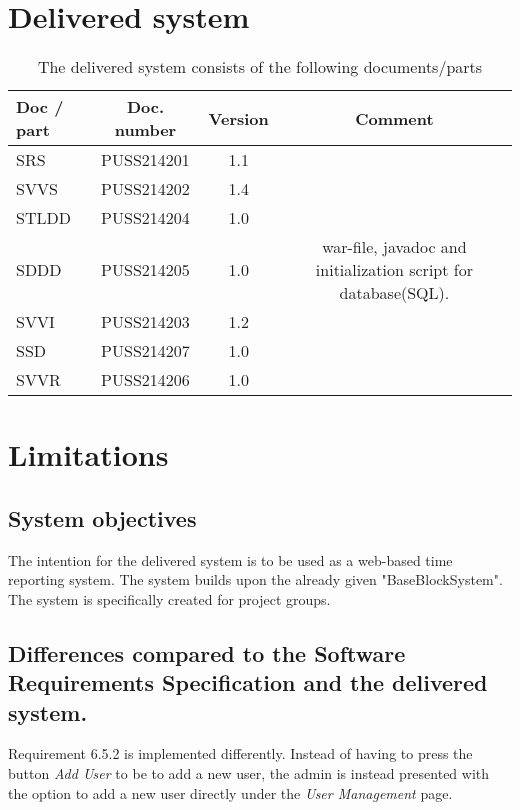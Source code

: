 \documentclass{article}
\begin{document}
\section{Delivered system}
 \begin{table}[h]
            \centering
            
             \caption{The delivered system consists of the following documents/parts}
            \begin{tabular}{|l|c|c|c|}
                \hline
                    \textbf{Doc / part} & \textbf{Doc.  number} & \textbf{Version} & \textbf{Comment} \\
                \hline
                    SRS & PUSS214201 & 1.1 &   \\
                 \hline
                    SVVS & PUSS214202 & 1.4 &  \\
                 \hline
                    STLDD & PUSS214204 & 1.0 &  \\
                 \hline
                    SDDD & PUSS214205  & 1.0 & war-file, javadoc and initialization script for database(SQL).   \\
                 \hline
                    SVVI & PUSS214203 & 1.2 &  \\
                 \hline
                    SSD & PUSS214207 & 1.0 &  \\
                 \hline
                    SVVR & PUSS214206 & 1.0 &  \\
                 \hline
                 
            \end{tabular}
           
            \label{activitytable}
        \end{table}

\section{Limitations}


\subsection{System objectives}
The intention for the delivered system is to be used as a web-based time reporting system. The system builds upon the already given "BaseBlockSystem". The system is specifically created for project groups.

\subsection{Differences  compared  to  the  Software  Requirements Specification and the delivered system.}
Requirement 6.5.2 is implemented differently. Instead of having to press  the button \textit{Add User} to be to add a new user, the admin is instead presented with the option to add a new user directly under the \textit{User Management} page.
\end{document}
